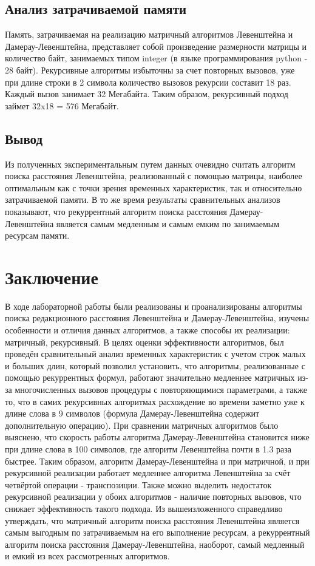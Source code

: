 \documentclass[12pt]{report}
\begin{document}
\section{Анализ затрачиваемой памяти}

Память, затрачиваемая на реализацию матричный алгоритмов Левенштейна и Дамерау-Левенштейна, представляет собой произведение размерности матрицы и количество байт, занимаемых типом integer (в языке программирования python - 28 байт). Рекурсивные алгоритмы избыточны за счет повторных вызовов, уже при длине строки в 2 символа количество вызовов рекурсии составит 18 раз. Каждый вызов занимает 32 Мегабайта. Таким образом, рекурсивный подход займет 32x18 = 576 Мегабайт.

\section{Вывод}
Из полученных экспериментальным путем данных очевидно считать алгоритм поиска расстояния Левенштейна, реализованный с помощью матрицы, наиболее оптимальным как с точки зрения временных характеристик, так и относительно затрачиваемой памяти. В то же время результаты сравнительных анализов показывают, что рекуррентный алгоритм поиска расстояния Дамерау-Левенштейна является самым медленным и самым емким по занимаемым ресурсам памяти.

\chapter*{Заключение}
В ходе лабораторной работы были реализованы и проанализированы алгоритмы поиска редакционного расстояния Левенштейна и Дамерау-Левенштейна, изучены особенности и отличия данных алгоритмов, а также способы их реализации: матричный, рекурсивный. В целях оценки эффективности алгоритмов, был проведён сравнительный анализ временных характеристик с учетом строк малых и больших длин, который позволил установить, что алгоритмы, реализованные с помощью рекуррентных формул, работают значительно медленнее матричных из-за многочисленных вызовов процедуры с повторяющимися параметрами, а также то, что в самих рекурсивных алгоритмах расхождение во времени заметно уже к длине слова в 9 символов (формула Дамерау-Левенштейна содержит дополнительную операцию). При сравнении матричных алгоритмов было выяснено, что скорость работы алгоритма Дамерау-Левенштейна становится ниже при длине слова в 100 символов, где алгоритм Левенштейна почти в 1.3 раза быстрее. Таким образом, алгоритм Дамерау-Левенштейна и при матричной, и при рекурсивной реализации работает медленнее алгоритма Левенштейна за счёт четвёртой операции - транспозиции. Также можно выделить недостаток рекурсивной реализации у обоих алгоритмов - наличие повторных вызовов, что снижает эффективность такого подхода. Из вышеизложенного справедливо утверждать, что матричный алгоритм поиска расстояния Левенштейна является самым выгодным по затрачиваемым на его выполнение ресурсам, а рекуррентный алгоритм поиска расстояния Дамерау-Левенштейна, наоборот, самый медленный и емкий из всех рассмотренных алгоритмов.



\end{document}
